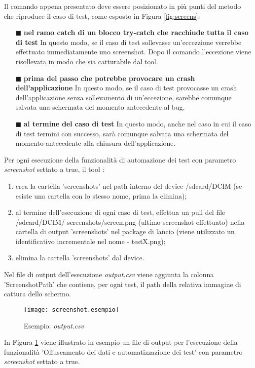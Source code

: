 \noindent Il comando appena presentato deve essere posizionato in più punti del metodo che riproduce il caso di test, come esposto in Figura \ref{fig:screens}:
\begin{itemize}
\item [$\blacksquare$] \textbf{nel ramo catch di un blocco try-catch che racchiude tutta il caso di test} \newline
In questo modo, se il caso di test sollevasse un'eccezzione verrebbe effettuato immediatamente uno screenshot. Dopo il comando l'eccezione viene risollevata in modo che sia catturabile dal tool.

\item [$\blacksquare$] \textbf{prima del passo che potrebbe provocare un crash dell'applicazione} \newline
In questo modo, se il caso di test provocasse un crash dell'applicazione senza sollevamento di un'eccezione, sarebbe comunque salvata una schermata del momento antecedente al bug.

\item [$\blacksquare$] \textbf{al termine del caso di test} \newline
In questo modo, anche nel caso in cui il caso di test termini con successo, sarà comunque salvata una schermata del momento antecedente alla chiusura dell'applicazione.
\end{itemize}

\bigskip
\noindent Per ogni esecuzione della funzionalità di automazione dei test con parametro \emph{screenshot} settato a true, il tool :
\begin{enumerate} [nosep]
\item crea la cartella 'screenshots' nel path interno del device  /sdcard/DCIM (se esiste una cartella con lo stesso nome, prima la elimina);
\item al termine dell'esecuzione di ogni caso di test, effettua un pull del file /sdcard/DCIM/
screenshots/screen.png (ultimo screenshot effettuato)  nella cartella di output 'screenshots' nel package di lancio (viene utilizzato un identificativo incrementale nel nome - testX.png);
\item elimina la cartella 'screenshots' dal device.
\end{enumerate}
\bigskip
\noindent Nel file di output dell'esecuzione \emph{output.csv} viene aggiunta la colonna 'ScreenshotPath' che contiene, per ogni test, il path della relativa immagine di cattura dello schermo. 
\begin{figure}[H]
	\texttt{[image: screenshot.esempio]}
	\centering
	\caption{Esempio: \emph{output.csv}}
    \label{fig:sesempio}
\end{figure}

\noindent In Figura \ref{fig:sesempio} viene illustrato in esempio un file di output per l'esecuzione della funzionalità 'Offuscamento dei dati e automatizzazione dei test' con parametro \emph{screenshot} settato a true.
